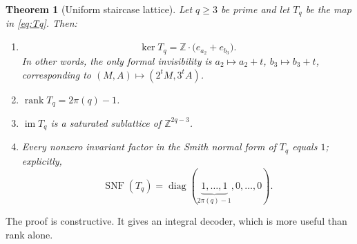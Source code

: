 \documentclass[11pt]{article}
\newtheorem{theorem}{Theorem}[section]
\theoremstyle{definition}
\theoremstyle{remark}
\newcommand{\Z}{\mathbb Z}
\newcommand{\rank}{\operatorname{rank}}
\newcommand{\im}{\operatorname{im}}
\newcommand{\diag}{\operatorname{diag}}
\begin{document}
\begin{theorem}[Uniform staircase lattice]\label{thm:uniformstaircase}
Let $q\ge3$ be prime and let $T_q$ be the map in \eqref{eq:Tq}.  Then:
\begin{enumerate}[label=\textup{(\roman*)}]
\item
\[
 \ker T_q
 =\Z\cdot\bigl(e_{a_2}+e_{b_3}\bigr).
\]
In other words, the only formal invisibility is
$a_2\mapsto a_2+t$, $b_3\mapsto b_3+t$, corresponding to
$(M,A)\mapsto(2^tM,3^tA)$.

\item $\rank T_q=2\pi(q)-1$.

\item $\im T_q$ is a saturated sublattice of $\Z^{2q-3}$.

\item Every nonzero invariant factor in the Smith normal form of $T_q$ equals
$1$; explicitly,
\[
 \operatorname{SNF}(T_q)
 =\diag(\underbrace{1,\ldots,1}_{2\pi(q)-1},0,\ldots,0).
\]
\end{enumerate}
\end{theorem}

The proof is constructive.  It gives an integral decoder, which is more useful
than rank alone.
\end{document}
